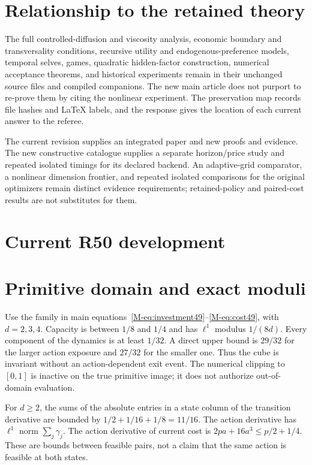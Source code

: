 \documentclass[ecta,nameyear,draft]{econsocart}
\begin{document}
\section{Relationship to the retained theory}
The full controlled-diffusion and viscosity analysis, economic boundary and transversality conditions, recursive utility and endogenous-preference models, temporal selves, games, quadratic hidden-factor construction, numerical acceptance theorems, and historical experiments remain in their unchanged source files and compiled companions. The new main article does not purport to re-prove them by citing the nonlinear experiment. The preservation map records file hashes and LaTeX labels, and the response gives the location of each current answer to the referee.

The current revision supplies an integrated paper and new proofs and evidence. The new constructive catalogue supplies a separate horizon/price study and repeated isolated timings for its declared backend. An adaptive-grid comparator, a nonlinear dimension frontier, and repeated isolated comparisons for the original optimizers remain distinct evidence requirements; retained-policy and paired-cost results are not substitutes for them.








\clearpage
\section*{Current R50 development}
\section{Primitive domain and exact moduli}\label{supp:primitive49}
Use the family in main equations~\eqref{M-eq:investment49}--\eqref{M-eq:cost49}, with $d=2,3,4$. Capacity is between $1/8$ and $1/4$ and has $\ell^1$ modulus $1/(8d)$. Every component of the dynamics is at least $1/32$. A direct upper bound is $29/32$ for the larger action exposure and $27/32$ for the smaller one. Thus the cube is invariant without an action-dependent exit event. The numerical clipping to $[0,1]$ is inactive on the true primitive image; it does not authorize out-of-domain evaluation.

For $d\ge2$, the sums of the absolute entries in a state column of the transition derivative are bounded by $1/2+1/16+1/8=11/16$. The action derivative has $\ell^1$ norm $\sum_j\gamma_j$. The action derivative of current cost is $2pa+16a^3\le p/2+1/4$. These are bounds between feasible pairs, not a claim that the same action is feasible at both states.
\end{document}
